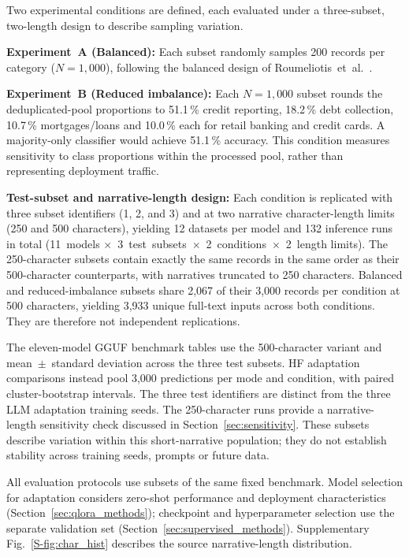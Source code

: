 \documentclass[pdflatex,sn-mathphys-num]{sn-jnl}
\begin{document}
Two experimental conditions are defined, each evaluated under a
three-subset, two-length design to describe sampling variation.

\textbf{Experiment~A (Balanced):} Each subset randomly samples 200
records per category ($N=1{,}000$), following the balanced design of
Roumeliotis~et~al.\ \cite{roumeliotis2025think}.

\textbf{Experiment~B (Reduced imbalance):} Each $N=1{,}000$ subset
rounds the deduplicated-pool proportions to 51.1\,\% credit reporting,
18.2\,\% debt collection, 10.7\,\% mortgages/loans and
10.0\,\% each for retail banking and credit cards. A majority-only
classifier would achieve 51.1\,\% accuracy. This condition measures
sensitivity to class proportions within the processed pool, rather
than representing deployment traffic.

\textbf{Test-subset and narrative-length design:}
Each condition is replicated with three subset identifiers (1, 2,
and 3) and at two narrative character-length limits (250 and 500
characters), yielding 12 datasets per model and 132 inference runs in
total (11~models $\times$~3~test~subsets~$\times$~2~conditions~$\times$~2~length
limits). The 250-character subsets contain exactly the same records in
the same order as their 500-character counterparts, with narratives
truncated to 250 characters. Balanced and reduced-imbalance subsets
share 2,067 of their 3,000 records per condition at 500 characters,
yielding 3,933 unique full-text inputs across both conditions. They
are therefore not independent replications.

The eleven-model GGUF benchmark tables use the 500-character variant
and mean~$\pm$~standard deviation across the three test subsets. HF
adaptation comparisons instead pool 3,000 predictions per mode and
condition, with paired cluster-bootstrap intervals. The three test
identifiers are distinct from the three LLM adaptation training seeds.
The 250-character runs provide a narrative-length
sensitivity check discussed in Section~\ref{sec:sensitivity}.
These subsets describe variation within this short-narrative population;
they do not establish stability across training seeds, prompts or future data.

All evaluation protocols use subsets of the same fixed benchmark.
Model selection for adaptation considers zero-shot performance and
deployment characteristics (Section~\ref{sec:qlora_methods});
checkpoint and hyperparameter selection use the separate validation
set (Section~\ref{sec:supervised_methods}). Supplementary
Fig.~\ref{S-fig:char_hist} describes the source narrative-length distribution.
\end{document}

